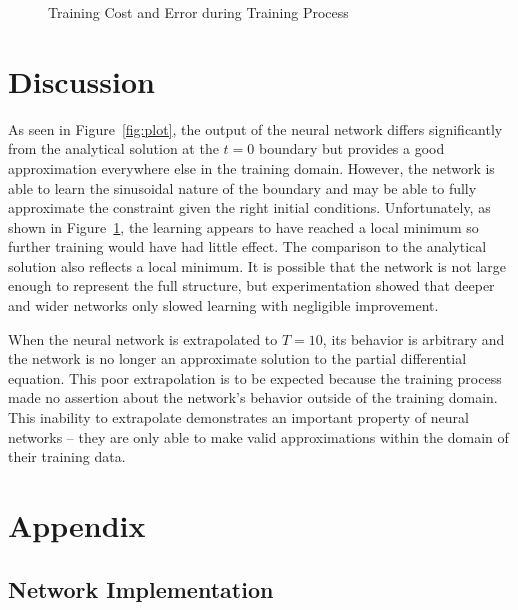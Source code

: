 \documentclass{article}
\def\model{may6}
\begin{document}
    \begin{figure}[!htbp]
      \centering
      \caption{Training Cost and Error during Training Process} \label{fig:loss}
    \end{figure}

  \section{Discussion}
    As seen in Figure~\ref{fig:plot}, the output of the neural network differs significantly from the analytical solution at the $t=0$ boundary but provides a good approximation everywhere else in the training domain. However, the network is able to learn the sinusoidal nature of the boundary and may be able to fully approximate the constraint given the right initial conditions. Unfortunately, as shown in Figure~\ref{fig:loss}, the learning appears to have reached a local minimum so further training would have had little effect. The comparison to the analytical solution also reflects a local minimum. It is possible that the network is not large enough to represent the full structure, but experimentation showed that deeper and wider networks only slowed learning with negligible improvement.

    When the neural network is extrapolated to $T=10$, its behavior is arbitrary and the network is no longer an approximate solution to the partial differential equation. This poor extrapolation is to be expected because the training process made no assertion about the network's behavior outside of the training domain. This inability to extrapolate demonstrates an important property of neural networks -- they are only able to make valid approximations within the domain of their training data.

  \printbibliography{}

  \appendix
  \section{Appendix}
  \setcounter{secnumdepth}{2}
  \renewcommand{\thesubsection}{\Alph{subsection}}
  \subsection{Network Implementation} \label{apx:code}
  
\end{document}
